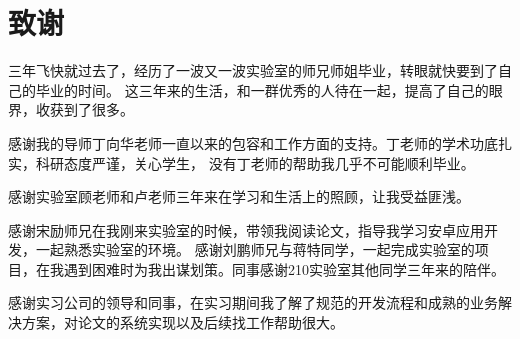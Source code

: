 \chapter{致谢}

三年飞快就过去了，经历了一波又一波实验室的师兄师姐毕业，转眼就快要到了自己的毕业的时间。 这三年来的生活，和一群优秀的人待在一起，提高了自己的眼界，收获到了很多。

感谢我的导师丁向华老师一直以来的包容和工作方面的支持。丁老师的学术功底扎实，科研态度严谨，关心学生， 没有丁老师的帮助我几乎不可能顺利毕业。

感谢实验室顾老师和卢老师三年来在学习和生活上的照顾，让我受益匪浅。

感谢宋励师兄在我刚来实验室的时候，带领我阅读论文，指导我学习安卓应用开发，一起熟悉实验室的环境。 感谢刘鹏师兄与蒋特同学，一起完成实验室的项目，在我遇到困难时为我出谋划策。同事感谢210实验室其他同学三年来的陪伴。

感谢实习公司的领导和同事，在实习期间我了解了规范的开发流程和成熟的业务解决方案，对论文的系统实现以及后续找工作帮助很大。